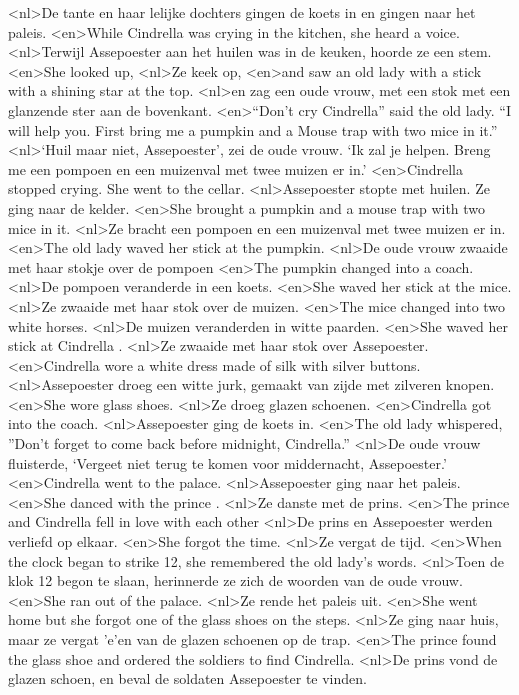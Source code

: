 <nl>De tante en haar lelijke dochters gingen de koets in en gingen naar het paleis. 
<en>While Cindrella was crying in the kitchen, she heard a  voice.
<nl>Terwijl Assepoester aan het huilen was in de keuken, hoorde ze een stem.
<en>She looked up,
<nl>Ze keek op,
<en>and saw an old lady with a stick with a  shining star at the top.
<nl>en zag een oude vrouw, met een stok met een glanzende ster aan de bovenkant.
<en>“Don’t cry Cindrella” said the old lady. “I will help you. First bring me a pumpkin and a Mouse trap with two mice in it.”
<nl>`Huil maar niet, Assepoester',  zei de oude vrouw. `Ik zal je helpen.  Breng me een pompoen en een muizenval met twee muizen er in.'
<en>Cindrella stopped crying. She went to the cellar.
<nl>Assepoester stopte met huilen. Ze ging naar de kelder.
<en>She brought a pumpkin and a mouse trap with two mice in it.
<nl>Ze bracht een pompoen en een muizenval met twee muizen er in.
<en>The old lady waved her stick at the pumpkin.
<nl>De oude vrouw zwaaide met haar stokje over de pompoen
<en>The pumpkin changed into a coach.
<nl>De pompoen veranderde in een koets.
<en>She waved her stick at the mice.
<nl>Ze zwaaide met haar stok over de muizen.
<en>The mice  changed into two white horses.
<nl>De muizen veranderden in witte paarden.
<en>She waved her stick at Cindrella .
<nl>Ze zwaaide met haar stok over Assepoester.
<en>Cindrella  wore a white dress made of silk  with silver buttons.
<nl>Assepoester droeg een witte jurk, gemaakt van zijde met zilveren knopen.
<en>She  wore glass shoes.
<nl>Ze droeg glazen schoenen.
<en>Cindrella got into the coach.
<nl>Assepoester ging de koets in.
<en>The old lady whispered, ”Don’t forget to come back before midnight, Cindrella.”
<nl>De oude vrouw fluisterde, `Vergeet niet terug te komen voor middernacht, Assepoester.'
<en>Cindrella went to the palace.
<nl>Assepoester ging naar het paleis.
<en>She danced with the prince .
<nl>Ze danste met de prins.
<en>The prince and Cindrella fell in love with each other
<nl>De prins en Assepoester werden verliefd op elkaar.
<en>She forgot the time.
<nl>Ze vergat de tijd.
<en>When the clock began to strike 12, she remembered the old lady’s words.
<nl>Toen de klok 12 begon te slaan, herinnerde ze zich de woorden van de oude vrouw. 
<en>She ran out of  the palace.
<nl>Ze rende het paleis uit.
<en>She went home but she  forgot one of the glass shoes on  the  steps.
<nl>Ze ging naar huis, maar ze vergat 'e'en van de glazen schoenen op de trap.
<en>The prince  found the glass shoe and  ordered  the soldiers to find Cindrella.
<nl>De prins vond de glazen schoen, en beval de soldaten Assepoester te vinden.
